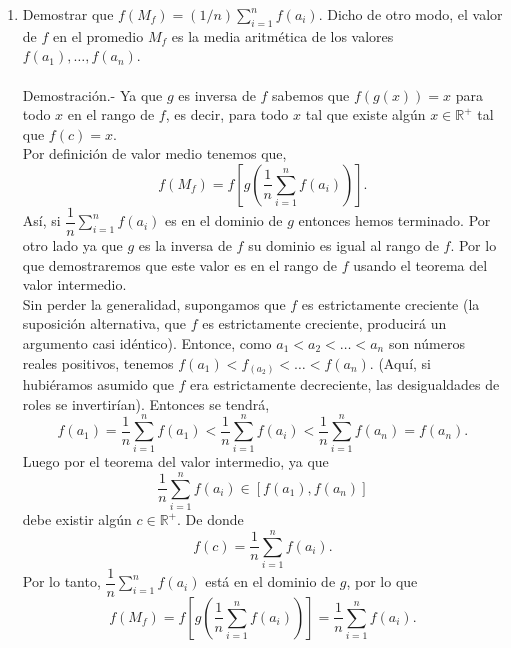 \begin{enumerate}[\bfseries 1.]
    \item Demostrar que $f(M_f) = (1/n)\sum\limits_{i=1}^n f(a_i)$. Dicho de otro modo, el valor de $f$ en el promedio $M_f$ es la media aritmética de los valores $f(a_1),\ldots,f(a_n)$.\\\\
	Demostración.-\; Ya que $g$ es inversa de $f$ sabemos que $f(g(x))=x$ para todo $x$ en el rango de $f$, es decir, para todo $x$ tal que existe algún $x\in \mathbb{R}^+$ tal que $f(c)=x.$\\
	Por definición de valor medio tenemos que,
	$$f(M_f)=f\left[g\left(\dfrac{1}{n}\sum_{i=1}^n f(a_i)\right)\right].$$
	Así, si $\dfrac{1}{n}\sum\limits_{i=1}^n f(a_i)$ es en el dominio de $g$ entonces hemos terminado. Por otro lado ya que $g$ es la inversa de $f$ su dominio es igual al rango de $f$. Por lo que demostraremos que este valor es en el rango de $f$ usando el teorema del valor intermedio.\\
	Sin perder la generalidad, supongamos que $f$ es estrictamente creciente (la suposición alternativa, que $f$ es estrictamente creciente, producirá un argumento casi idéntico).  Entonce, como $a_1<a_2<\ldots<a_n$ son números reales positivos, tenemos $f(a_1)<f_(a_2)<\ldots<f(a_n)$. (Aquí, si hubiéramos asumido que $f$ era estrictamente decreciente, las desigualdades de roles se invertirían). Entonces se tendrá,
	$$f(a_1)=\dfrac{1}{n}\sum_{i=1}^n  f(a_1) < \dfrac{1}{n}\sum_{i=1}^n f(a_i) < \dfrac{1}{n}\sum_{i=1}^n f(a_n)=f(a_n).$$
	Luego por el teorema del valor intermedio, ya que
	$$\dfrac{1}{n}\sum_{i=1}^n f(a_i) \in [f(a_1),f(a_n)]$$
	debe existir algún $c\in \mathbb{R}^+$. De donde
	$$f(c)=\dfrac{1}{n}\sum_{i=1}^n f(a_i).$$
	Por lo tanto, $\dfrac{1}{n}\sum\limits_{i=1}^n f(a_i)$ está en el dominio de $g$, por lo que
	$$f(M_f) = f\left[g\left(\dfrac{1}{n}\sum_{i=1}^n f(a_i)\right)\right]=\dfrac{1}{n}\sum_{i=1}^n f(a_i).$$\\




\end{enumerate}
